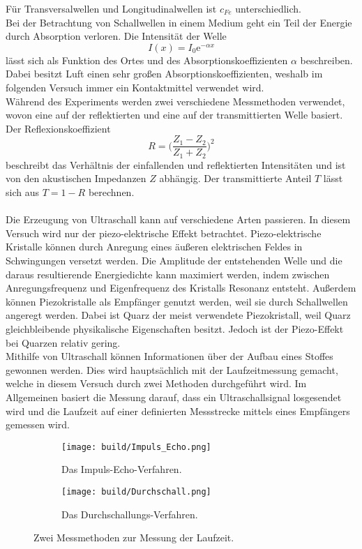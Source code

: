 Für Transversalwellen und Longitudinalwellen ist $c_{Fe}$ unterschiedlich.\\
Bei der Betrachtung von Schallwellen in einem Medium geht ein Teil der Energie durch Absorption verloren.
Die Intensität der Welle 
\begin{equation*}
    I(x) = I_0 \text{e}^{-\alpha x}
    \label{eqn:Intensi}
\end{equation*}
lässt sich als Funktion des Ortes und des Absorptionskoeffizienten $\alpha$ beschreiben. Dabei besitzt Luft einen sehr großen Absorptionskoeffizienten,
weshalb im folgenden Versuch immer ein Kontaktmittel verwendet wird.\\
Während des Experiments werden zwei verschiedene Messmethoden verwendet, wovon eine auf der reflektierten und eine auf der transmittierten Welle basiert.
Der Reflexionskoeffizient 
\begin{equation*}
    R = \Biggl(\frac{Z_1-Z_2}{Z_1+Z_2}\Biggr)^2
\end{equation*}
beschreibt das Verhältnis der einfallenden und reflektierten Intensitäten und ist von den akustischen Impedanzen $Z$ abhängig.
Der transmittierte Anteil $T$ lässt sich aus $T = 1 - R$ berechnen.\\
\\
Die Erzeugung von Ultraschall kann auf verschiedene Arten passieren. In diesem Versuch wird nur der piezo-elektrische Effekt betrachtet.
Piezo-elektrische Kristalle können durch Anregung eines äußeren elektrischen Feldes in Schwingungen versetzt werden.
Die Amplitude der entstehenden Welle und die daraus resultierende Energiedichte kann maximiert werden, indem zwischen Anregungsfrequenz und Eigenfrequenz
des Kristalls Resonanz entsteht.
Außerdem können Piezokristalle als Empfänger genutzt werden, weil sie durch Schallwellen angeregt werden.
Dabei ist Quarz der meist verwendete Piezokristall, weil Quarz gleichbleibende physikalische Eigenschaften besitzt.
Jedoch ist der Piezo-Effekt bei Quarzen relativ gering.\\
Mithilfe von Ultraschall können Informationen über der Aufbau eines Stoffes gewonnen werden. Dies wird hauptsächlich mit der Laufzeitmessung gemacht,
welche in diesem Versuch durch zwei Methoden durchgeführt wird. Im Allgemeinen basiert die Messung darauf, dass ein Ultraschallsignal 
losgesendet wird und die Laufzeit auf einer definierten Messstrecke mittels eines Empfängers gemessen wird.\\
\begin{figure}[H]
    \begin{subfigure}{0.48\textwidth}
       \centering
       \texttt{[image: build/Impuls\_Echo.png]}
       \caption{Das Impuls-Echo-Verfahren.}
       \label{fig:ImpulsEcho}
    \end{subfigure}
    \hfill
    \begin{subfigure}{0.48\textwidth}    
        \centering
        \texttt{[image: build/Durchschall.png]}
        \caption{Das Durchschallungs-Verfahren.}
        \label{fig:Durchschallung}
    \end{subfigure}
    \caption{Zwei Messmethoden zur Messung der Laufzeit\cite{VUS1}.}
    \label{fig:Methoden}
\end{figure}
